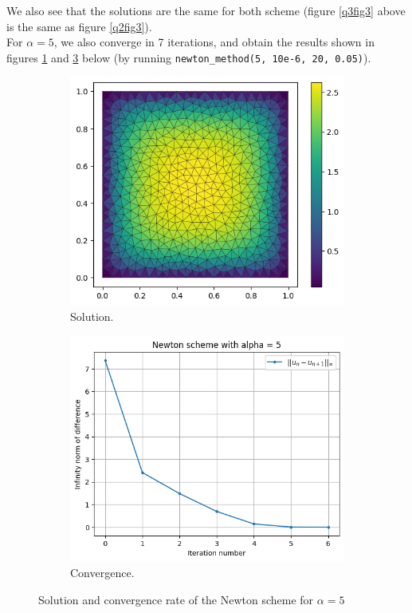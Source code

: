 \documentclass[11pt, a4paper, twoside]{article}
\begin{document}
We also see that the solutions are the same for both scheme (figure \ref{q3fig3} above is the same as figure \ref{q2fig3}).\\


For $\alpha=5$, we also converge in 7 iterations, and obtain the results shown in figures \ref{q3fig5} and \ref{q3fig6} below (by running \verb+newton_method(5, 10e-6, 20, 0.05)+).

\begin{figure}[H]
\begin{subfigure}[h]{0.5\linewidth}
\includegraphics[scale = 0.6]{../Figures/newt_sol_alpha5.png}
\caption{Solution.}
\label{q3fig5}
\end{subfigure}
\hfill
\begin{subfigure}[h]{0.5\linewidth}
\includegraphics[scale = 0.6]{../Figures/newt_conv_alpha5.png}
\caption{Convergence.}
\label{q3fig6}
\end{subfigure}%
\caption{Solution and convergence rate of the Newton scheme for $\alpha=5$}
\end{figure}
\end{document}
